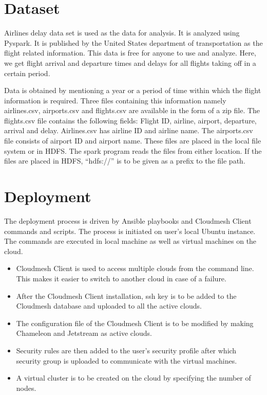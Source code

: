 \documentclass[9pt,twocolumn,twoside]{../../styles/osajnl}
\begin{document}
\section{Dataset}

Airlines delay data set is used as the data for analysis. It is
analyzed using Pyspark. It is published by the United States
department of transportation as the flight related information. This
data is free for anyone to use and analyze. Here, we get flight
arrival and departure times and delays for all flights taking off in a
certain period.

Data is obtained by mentioning a year or a period of time within which
the flight information is required. Three files containing this
information namely airlines.csv, airports.csv and flights.csv are
available in the form of a zip file. The flights.csv file contains the
following fields: Flight ID, airline, airport, departure, arrival and
delay. Airlines.csv has airline ID and airline name. The airports.csv
file consists of airport ID and airport name. These files are placed
in the local file system or in HDFS. The spark program reads the files
from either location. If the files are placed in HDFS, “hdfs://” is
to be given as a prefix to the file path.


\section{Deployment} 


The deployment process is driven by Ansible playbooks and Cloudmesh
Client commands and scripts. The process is initiated on user’s local
Ubuntu instance. The commands are executed in local machine as well as
virtual machines on the cloud.

\begin{itemize}

\item Cloudmesh Client is used to access multiple clouds from the
  command line. This makes it easier to switch to another cloud in
  case of a failure. 
  
  
\item After the Cloudmesh Client installation, ssh key is to be added
  to the Cloudmesh database and uploaded to all the active clouds.

\item The configuration file of the Cloudmesh Client is to be modified
  by making Chameleon and Jetstream as active clouds.

\item Security rules are then added to the user’s security profile
  after which security group is uploaded to communicate with the
  virtual machines.

\item A virtual cluster is to be created on the cloud by specifying the number of nodes. 
\end{itemize}
\end{document}

